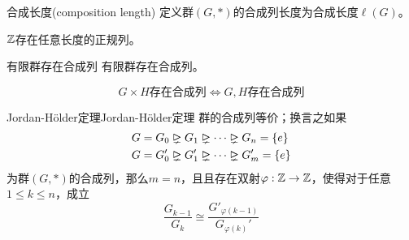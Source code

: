 \begin{definition}{合成长度(composition length)}
	定义群$(G,*)$的合成列长度为合成长度$\ell(G)$。
\end{definition}

\begin{example}
	$\mathbb{Z}$存在任意长度的正规列。
\end{example}

\begin{proposition}{有限群存在合成列}
	有限群存在合成列。
\end{proposition}

\begin{proposition}
	$$
	G\times H\text{存在合成列}\iff G,H\text{存在合成列}
	$$
\end{proposition}

\begin{theorem}{Jordan-Hölder定理}{Jordan-Hölder定理}
	群的合成列等价；换言之如果
	\begin{align*}
		&G=G_0\rhdneq  G_1 \rhdneq  \cdots \rhdneq   G_n=\{e\}\\
		&G=G_0'\rhdneq  G_1' \rhdneq  \cdots \rhdneq   G_m'=\{e\}
	\end{align*}
	为群$(G,*)$的合成列，那么$m=n$，且且存在双射$\varphi:\mathbb{Z}\to\mathbb{Z}$，使得对于任意$1\le k\le n$，成立
	$$
	\frac{G_{k-1}}{G_{k}}\cong\frac{G'_{\varphi(k-1)}}{G_{\varphi(k)}'}
	$$
\end{theorem}

